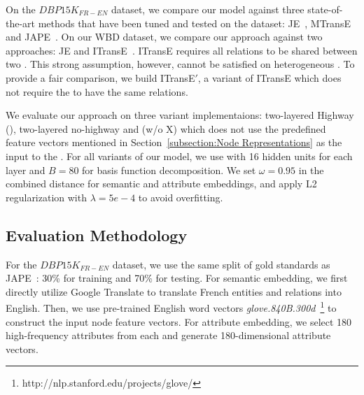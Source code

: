     On the $DBP15K_{FR-EN}$ dataset, we compare our \HRGCN model against three state-of-the-art methods that have been tuned and tested on
    the dataset: JE~\cite{hao2016joint}, MTransE~\cite{chen2016multilingual} and JAPE~\cite{sun2017cross}.
	On our WBD dataset, we compare our approach against two approaches: JE and ITransE~\cite{zhu2017iterative}. ITransE requires all relations to be
shared between two \KGs. This strong assumption, however, cannot be satisfied on heterogeneous \KGs. To provide a fair comparison, we build
ITransE$'$, a variant of ITransE which does not require the \KGs to have the same relations. 	


	
	 We evaluate our approach on three variant implementaions: two-layered Highway \RGCN (\HRGCN),
two-layered no-highway \RGCN and \HRGCN (w/o X) which does not use the predefined feature vectors mentioned in Section~\ref{subsection:Node
Representations} as the input to the \HRGCN. For all variants of our model, we use \RGCN with 16 hidden units for each layer and $B = 80$
for basis function decomposition. We set $\omega=0.95$ in the combined distance for semantic and attribute embeddings, and apply L2
regularization with $\lambda=5e-4$ to avoid overfitting.


	
	



	\subsection{Evaluation Methodology}
    	For the $DBP15K_{FR-EN}$ dataset, we use the same split of gold standards as JAPE~\cite{sun2017cross}: 30\% for training and 70\% for
    testing.
	For semantic embedding, we first directly utilize Google Translate to translate French entities and relations into English.
	Then, we use pre-trained English word vectors \emph{glove.840B.300d}~\footnote{http://nlp.stanford.edu/projects/glove/} to construct the input node feature vectors.
	For attribute embedding, we select 180 high-frequency attributes from each \KG and generate 180-dimensional attribute vectors.	


